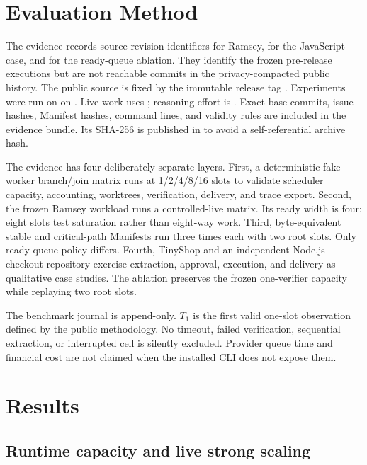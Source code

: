 \documentclass[10pt,twocolumn]{article}
\begin{document}
\section{Evaluation Method}

The evidence records source-revision identifiers \texttt{\FGRamseySourceRevision} for Ramsey,
\texttt{\FGJavaScriptSourceRevision} for the JavaScript case, and
\texttt{\FGCPAblationSourceRevision} for the ready-queue ablation. They identify the frozen
pre-release executions but are not reachable commits in the privacy-compacted public history. The
public source is fixed by the immutable release tag \texttt{\FGReleaseRevision}. Experiments were run on \FGHostSummary{} on \FGExperimentDate. Live work
uses \FGPlannerModel{}; reasoning effort is \FGReasoningEffort{}. Exact base commits, issue hashes,
Manifest hashes, command lines, and validity rules are included in the evidence bundle. Its SHA-256
is published in \FGEvidenceBundleChecksum{} to avoid a self-referential archive hash.

The evidence has four deliberately separate layers. First, a deterministic fake-worker branch/join
matrix runs at 1/2/4/8/16 slots to validate scheduler capacity, accounting, worktrees, verification,
delivery, and trace export. Second, the frozen Ramsey workload runs a controlled-live
\FGRamseyRuns{} matrix. Its ready width is four; eight slots test saturation rather than eight-way
work. Third, byte-equivalent stable and critical-path Manifests run three times each with two root
slots. Only ready-queue policy differs. Fourth, TinyShop and an independent Node.js checkout
repository exercise extraction, approval, execution, and delivery as qualitative case studies. The
ablation preserves the frozen one-verifier capacity while replaying two root slots.

The benchmark journal is append-only. $T_1$ is the first valid one-slot observation defined by the
public methodology. No timeout, failed verification, sequential extraction, or interrupted cell is
silently excluded. Provider queue time and financial cost are not claimed when the installed CLI
does not expose them.

\section{Results}

\subsection{Runtime capacity and live strong scaling}
\end{document}

